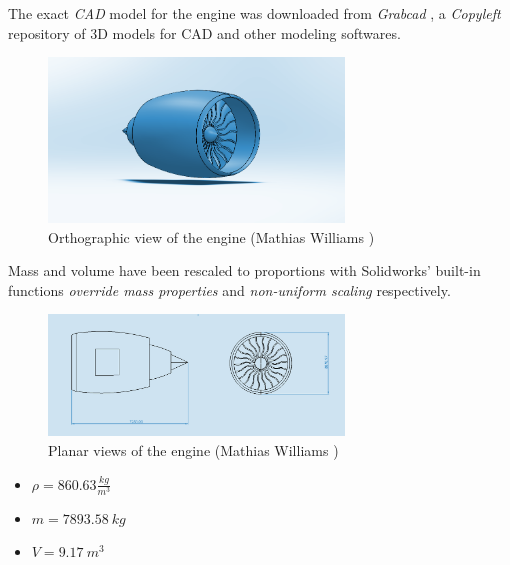 \documentclass{article}
\begin{document}
The exact \textit{CAD} model for the engine was downloaded from \textit{Grabcad} \autocite{grabcad_ge9094b}, a \textit{Copyleft}
repository of 3D models for CAD and other modeling softwares. \\ 

\begin{figure}[h!]
    \centering
    \includegraphics[width=0.7\textwidth]{Sources/Plots_and_Pictures/engine_cad_3D.png}
    \caption{Orthographic view of the engine (Mathias Williams \autocite{grabcad_ge9094b})}
    \label{engine_cad}
\end{figure}

Mass and volume have been rescaled to proportions with Solidworks' built-in functions
\textit{override mass properties} and \textit{non-uniform scaling} respectively.

\begin{figure}[h!]
    \centering
    \includegraphics[width=0.7\textwidth]{Sources/Plots_and_Pictures/engine_pianta.png}
    \caption{Planar views of the engine (Mathias Williams \autocite{grabcad_ge9094b})}
    \label{engine_pianta}
\end{figure}

\begin{itemize}
    \item $\rho = 860.63 \frac{kg}{m^3}$
    \item $m = 7893.58 \ kg$
    \item $V = 9.17 \ m^3$
\end{itemize}

\clearpage
\end{document}
